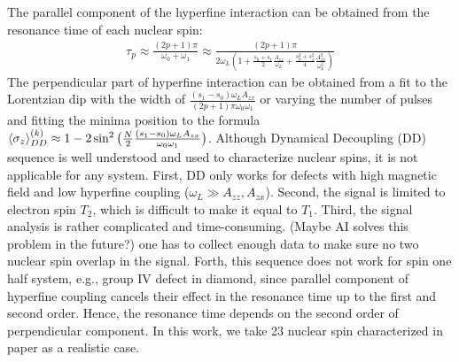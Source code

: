 \documentclass[%
 reprint,
superscriptaddress,
 amsmath,amssymb,
 aps,
]{revtex4-2}
\begin{document}
The parallel component of the hyperfine interaction can be obtained from the resonance time of each nuclear spin:
\begin{gather}
	\tau_p \approx  \frac{(2p+1) \pi}{\omega_0 + \omega_1} \approx \frac{(2p+1)\pi}{2\omega_L(1+\frac{s_0+s_1}{2} \frac{A_{zz}}{\omega_L}+ \frac{s_0^2+s_1^2}{4}\frac{A_{zx}^2}{\omega_L^2})}
\end{gather}
The perpendicular part of hyperfine interaction can be obtained from a fit to the Lorentzian dip with the width of $\frac{(s_1-s_0)\omega_L A_{zx}}{(2p+1)\pi\omega_0 \omega_1}$ or varying the number of pulses and fitting the minima position to the formula $\expval{\sigma_z}_{DD}^{(k)} \approx 1- 2 \sin^2\big(\frac{N}{2}\frac{(s_1-s_0)\omega_L A_{zx}}{\omega_0 \omega_1}\big) $. Although Dynamical Decoupling (DD) sequence is well understood and used to characterize nuclear spins, it is not applicable for any system. First, DD only works for defects with high magnetic field and low hyperfine coupling ($\omega_L \gg A_{zz}, A_{zx}$). Second, the signal is limited to electron spin $T_2$, which is difficult to make it equal to $T_1$. Third, the signal analysis is rather complicated and time-consuming. (Maybe AI solves this problem in the future?) one has to collect enough data to make sure no two nuclear spin overlap in the signal. Forth, this sequence does not work for spin one half system, e.g., group IV defect in diamond, since parallel component of hyperfine coupling cancels their effect in the resonance time up to the first and second order. Hence, the resonance time depends on the second order of perpendicular component. In this work, we take 23 nuclear spin characterized in paper \cite{abobeih2019atomic} as a realistic case. 
\end{document}
